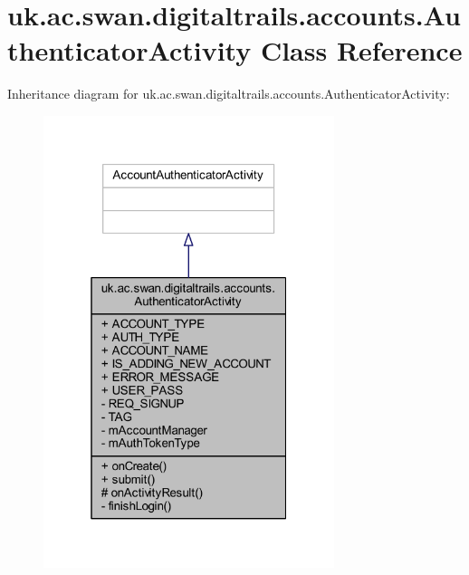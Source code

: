 \hypertarget{classuk_1_1ac_1_1swan_1_1digitaltrails_1_1accounts_1_1_authenticator_activity}{\section{uk.\+ac.\+swan.\+digitaltrails.\+accounts.\+Authenticator\+Activity Class Reference}
\label{classuk_1_1ac_1_1swan_1_1digitaltrails_1_1accounts_1_1_authenticator_activity}
}


Inheritance diagram for uk.\+ac.\+swan.\+digitaltrails.\+accounts.\+Authenticator\+Activity\+:
\nopagebreak
\begin{figure}[H]
\begin{center}
\leavevmode
\includegraphics[width=241pt]{classuk_1_1ac_1_1swan_1_1digitaltrails_1_1accounts_1_1_authenticator_activity__inherit__graph}
\end{center}
\end{figure}


